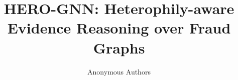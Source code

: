 \documentclass[letterpaper]{article}
\title{HERO-GNN: Heterophily-aware Evidence Reasoning over Fraud Graphs}
\author{Anonymous Authors}
\begin{document}
\maketitle

\begin{abstract}

\end{abstract}









\end{document}
